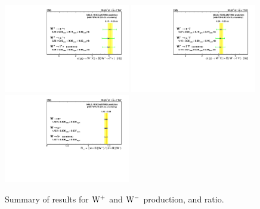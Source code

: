 \begin{figure}
\begin{center}
  \includegraphics[width=0.49\textwidth]{figs/Results_W_plus.pdf}
  \includegraphics[width=0.49\textwidth]{figs/Results_W_minus.pdf}
\\
  \includegraphics[width=0.49\textwidth]{figs/Results_R_WpWm.pdf}
\caption[.]{\label{fig:WPM_LEPstylePlots}
Summary of results for $\mathrm{W^+}$ and $\mathrm{W^-}$ production, and ratio. }
\end{center}
\end{figure}


